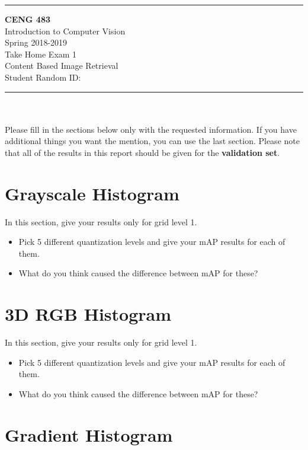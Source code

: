 \documentclass[12pt]{article}
\newcommand{\HRule}{\rule{\linewidth}{1mm}}
\begin{document}
\noindent
\HRule %
\small
\begin{center}
	\LARGE \textbf{CENG 483} \\[4mm]
	\Large Introduction to Computer Vision \\[4mm]
	\normalsize Spring 2018-2019 \\
	\Large Take Home Exam 1 \\
	\Large Content Based Image Retrieval \\
    \Large Student Random ID: \\
\end{center}
\HRule

\begin{center}
\end{center}
\vspace{-10mm}
\noindent\\ \\ 
Please fill in the sections below only with the requested information. If you have additional things you want the mention, you can use the last section. Please note that all of the results in this report should be given for the \textbf{validation set}.
\section{Grayscale Histogram}
In this section, give your results only for grid level 1.

\begin{itemize}
\item Pick 5 different quantization levels and give your mAP results for each of them.
\item What do you think caused the difference between mAP for these?
\end{itemize}

\section{3D RGB Histogram}
In this section, give your results only for grid level 1.

\begin{itemize}
\item Pick 5 different quantization levels and give your mAP results for each of them.
\item What do you think caused the difference between mAP for these?
\end{itemize}

\section{Gradient Histogram}
\end{document}
